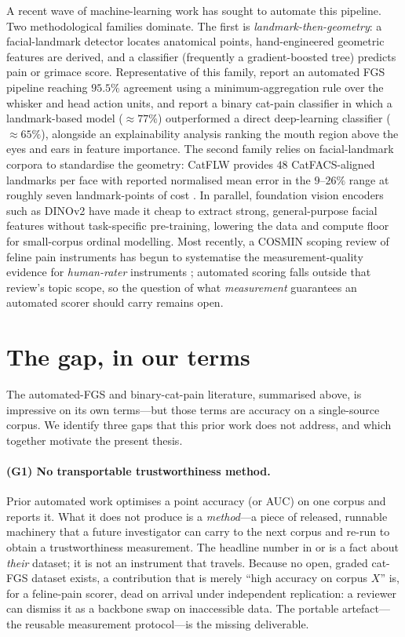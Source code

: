A recent wave of machine-learning work has sought to automate this pipeline.
Two methodological families dominate. The first is \emph{landmark-then-geometry}:
a facial-landmark detector locates anatomical points, hand-engineered geometric
features are derived, and a classifier (frequently a gradient-boosted tree)
predicts pain or grimace score. Representative of this family,
\textcite{steagall2023} report an automated FGS pipeline reaching $95.5\%$
agreement using a minimum-aggregation rule over the whisker and head action units,
and \textcite{feighelstein2023} report a binary cat-pain classifier in which a
landmark-based model ($\approx 77\%$) outperformed a direct deep-learning
classifier ($\approx 65\%$), alongside an explainability analysis ranking the
mouth region above the eyes and ears in feature importance. The second family
relies on facial-landmark corpora to standardise the geometry: CatFLW provides
$48$ CatFACS-aligned landmarks per face with reported normalised mean error in
the $9$--$26\%$ range at roughly seven landmark-points of cost
\autocite{martvel2024catflw}. In parallel, foundation vision encoders such as
DINOv2 \autocite{oquab2023dinov2} have made it cheap to extract strong,
general-purpose facial features without task-specific pre-training, lowering the
data and compute floor for small-corpus ordinal modelling. Most recently, a COSMIN
scoping review of feline pain instruments has begun to systematise the
measurement-quality evidence for \emph{human-rater} instruments
\autocite{leesteagall2026}; automated scoring falls outside that review's topic
scope, so the question of what \emph{measurement} guarantees an automated scorer
should carry remains open.

\section{The gap, in our terms}
\label{sec:intro-gap}

The automated-FGS and binary-cat-pain literature, summarised above, is impressive
on its own terms---but those terms are accuracy on a single-source corpus. We
identify three gaps that this prior work does not address, and which together
motivate the present thesis.

\paragraph{(G1) No transportable trustworthiness method.}
Prior automated work optimises a point accuracy (or AUC) on one corpus and reports
it. What it does not produce is a \emph{method}---a piece of released, runnable
machinery that a future investigator can carry to the next corpus and re-run to
obtain a trustworthiness measurement. The headline number in
\textcite{steagall2023} or \textcite{feighelstein2023} is a fact about
\emph{their} dataset; it is not an instrument that travels. Because no open,
graded cat-FGS dataset exists, a contribution that is merely ``high accuracy on
corpus $X$'' is, for a feline-pain scorer, dead on arrival under independent
replication: a reviewer can dismiss it as a backbone swap on inaccessible data.
The portable artefact---the reusable measurement protocol---is the missing
deliverable.


